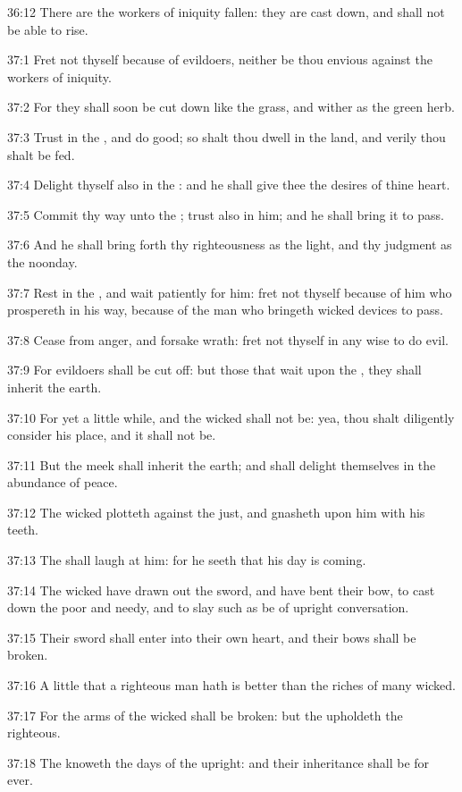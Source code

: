 36:12 There are the workers of iniquity fallen: they are cast down, and shall not be able to rise.



37:1 Fret not thyself because of evildoers, neither be thou envious against the workers of iniquity.

37:2 For they shall soon be cut down like the grass, and wither as the green herb.

37:3 Trust in the \LORD, and do good; so shalt thou dwell in the land, and verily thou shalt be fed.

37:4 Delight thyself also in the \LORD: and he shall give thee the desires of thine heart.

37:5 Commit thy way unto the \LORD; trust also in him; and he shall bring it to pass.

37:6 And he shall bring forth thy righteousness as the light, and thy judgment as the noonday.

37:7 Rest in the \LORD, and wait patiently for him: fret not thyself because of him who prospereth in his way, because of the man who bringeth wicked devices to pass.

37:8 Cease from anger, and forsake wrath: fret not thyself in any wise to do evil.

37:9 For evildoers shall be cut off: but those that wait upon the \LORD, they shall inherit the earth.

37:10 For yet a little while, and the wicked shall not be: yea, thou shalt diligently consider his place, and it shall not be.

37:11 But the meek shall inherit the earth; and shall delight themselves in the abundance of peace.

37:12 The wicked plotteth against the just, and gnasheth upon him with his teeth.

37:13 The \LORD shall laugh at him: for he seeth that his day is coming.

37:14 The wicked have drawn out the sword, and have bent their bow, to cast down the poor and needy, and to slay such as be of upright conversation.

37:15 Their sword shall enter into their own heart, and their bows shall be broken.

37:16 A little that a righteous man hath is better than the riches of many wicked.

37:17 For the arms of the wicked shall be broken: but the \LORD upholdeth the righteous.

37:18 The \LORD knoweth the days of the upright: and their inheritance shall be for ever.

